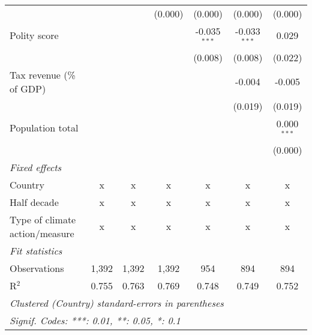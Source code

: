 \begin{tabular}{lcccccc}
                                                                              &               &               & (0.000)        & (0.000)        & (0.000)        & (0.000)\\   
   Polity score                                                               &               &               &                & -0.035$^{***}$ & -0.033$^{***}$ & 0.029\\   
                                                                              &               &               &                & (0.008)        & (0.008)        & (0.022)\\   
   Tax revenue (\% of GDP)                                                    &               &               &                &                & -0.004         & -0.005\\   
                                                                              &               &               &                &                & (0.019)        & (0.019)\\   
   Population total                                                           &               &               &                &                &                & 0.000$^{***}$\\   
                                                                              &               &               &                &                &                & (0.000)\\   
   \emph{Fixed effects}\\
   Country                                                                    & x             & x             & x              & x              & x              & x\\  
   Half decade                                                                & x             & x             & x              & x              & x              & x\\  
   Type of climate action/measure                                             & x             & x             & x              & x              & x              & x\\  
   \midrule \emph{Fit statistics}\\
   Observations                                                               & 1,392         & 1,392         & 1,392          & 954            & 894            & 894\\  
   R$^2$                                                                      & 0.755         & 0.763         & 0.769          & 0.748          & 0.749          & 0.752\\  
   \midrule
   \multicolumn{7}{l}{\emph{Clustered (Country) standard-errors in parentheses}}\\
   \multicolumn{7}{l}{\emph{Signif. Codes: ***: 0.01, **: 0.05, *: 0.1}}\\
\end{tabular}
\par\endgroup


